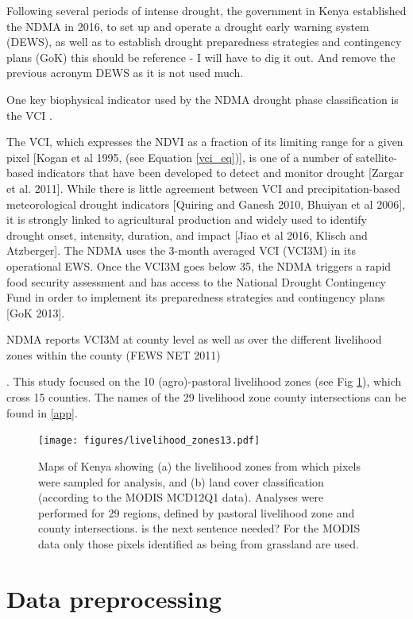 \documentclass[review]{elsarticle}
\begin{document}
Following several periods of intense drought, the government in Kenya established the NDMA in 2016, to set up and operate a drought early warning system (DEWS), as well as to establish drought preparedness strategies and contingency plans (GoK){\color{green} this should be reference - I will have to dig it out. And remove the previous acronym DEWS as it is not used much}. 

One key biophysical indicator used by the NDMA drought phase classification is the VCI \citep{rs8040267}. {\color{blue} The VCI, which expresses the NDVI as a fraction of its limiting range for a given pixel [Kogan et al 1995, (see Equation \ref{vci_eq})], is one of a number of satellite-based indicators that have been developed to detect and monitor drought [Zargar et al. 2011]. While there is little agreement between VCI and precipitation-based meteorological drought indicators [Quiring and Ganesh 2010, Bhuiyan et al 2006], it is strongly linked to agricultural production and widely used to identify drought onset, intensity, duration, and impact [Jiao et al 2016, Klisch and Atzberger]. The NDMA uses the 3-month averaged VCI (VCI3M)  in its operational EWS. Once the VCI3M goes below 35, the NDMA triggers a rapid food security assessment and has access to the National Drought Contingency Fund in order to implement its preparedness strategies and contingency plans [GoK 2013].

NDMA reports VCI3M at county level as well as over the different livelihood zones within the county (FEWS NET 2011)}.
This study focused on the 10 (agro)-pastoral livelihood zones (see Fig \ref{fig:l_zone}), which cross 15 counties. The names of the 29 livelihood zone county intersections can be found in \ref{app}. 


\begin{figure}
	\centering
	\texttt{[image: figures/livelihood\_zones13.pdf]} 
	\caption{Maps of Kenya showing (a) the livelihood zones from which pixels were sampled for analysis, and (b) land cover classification (according to the MODIS MCD12Q1 data). Analyses were performed for 29 regions, defined by pastoral livelihood zone and county intersections. {\color{green} is the next sentence needed?} For the MODIS data only those pixels identified as being from grassland are used.} \label{fig:l_zone}
\end{figure}


\section{Data preprocessing} \label{sec:data}
\end{document}
